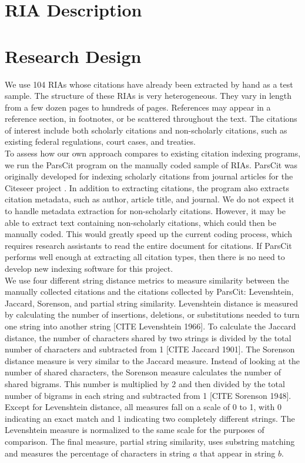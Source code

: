 \documentclass[12pt]{article}
\begin{document}
\section{RIA Description}

\section{Research Design}
We use 104 RIAs whose citations have already been extracted by hand as a test sample. The structure of these RIAs is very heterogeneous. They vary in length from a few dozen pages to hundreds of pages. References may appear in a reference section, in footnotes, or be scattered throughout the text. The citations of interest include both scholarly citations and non-scholarly citations, such as existing federal regulations, court cases, and treaties. \\ 

To assess how our own approach compares to existing citation indexing programs, we run the ParsCit program on the manually coded sample of RIAs. ParsCit was originally developed for indexing scholarly citations from journal articles for the Citeseer project \cite{councilletal2008}. In addition to extracting citations, the program also extracts citation metadata, such as author, article title, and journal. We do not expect it to handle metadata extraction for non-scholarly citations. However, it may be able to extract text containing non-scholarly citations, which could then be manually coded. This would greatly speed up the current coding process, which requires research assistants to read the entire document for citations. If ParsCit performs well enough at extracting all citation types, then there is no need to develop new indexing software for this project.\\

We use four different string distance metrics to measure similarity between the manually collected citations and the citations collected by ParsCit: Levenshtein, Jaccard, Sorenson, and partial string similarity. Levenshtein distance is measured by calculating the number of insertions, deletions, or substitutions needed to turn one string into another string [CITE Levenshtein 1966]. To calculate the Jaccard distance, the number of characters shared by two strings is divided by the total number of characters and subtracted from 1 [CITE Jaccard 1901]. The Sorenson distance measure is very similar to the Jaccard measure. Instead of looking at the number of shared characters, the Sorenson measure calculates the number of shared bigrams. This number is multiplied by 2 and then divided by the total number of bigrams in each string and subtracted from 1 [CITE Sorenson 1948]. Except for Levenshtein distance, all measures fall on a scale of 0 to 1, with 0 indicating an exact match and 1 indicating two completely different strings. The Levenshtein measure is normalized to the same scale for the purposes of comparison. The final measure, partial string similarity, uses substring matching and measures the percentage of characters in string $a$ that appear in string $b$.\\
\end{document}
